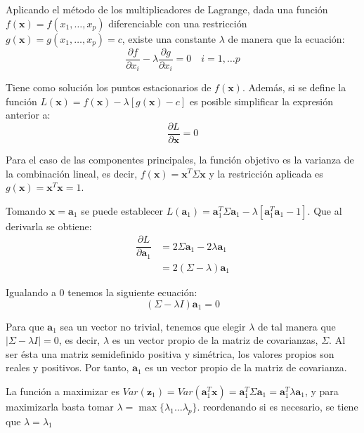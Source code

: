 \noindent Aplicando el método de los multiplicadores de Lagrange,  dada una función $f(\textbf{x})=f(x_1,\ldots, x_p)$ diferenciable con una restricción $g(\textbf{x})=g(x_1, \ldots, x_p)=c$,  existe una constante $\lambda$ de manera que la ecuación:
\begin{equation}
\dfrac{\partial f}{\partial x_i}-\lambda\dfrac{\partial g}{\partial x_i}=0 \quad i=1,\ldots p 
\end{equation}

\noindent Tiene como solución los puntos estacionarios de $f(\textbf{x})$. Además, si se define la función $L(\textbf{x})= f(\textbf{x})-\lambda[g(\textbf{x})-c]$  es posible simplificar la expresión anterior a:
\begin{equation}
\dfrac{\partial L}{\partial \textbf{x}}=0
\end{equation}

\noindent Para el caso de las componentes principales, la función objetivo es la varianza de la combinación lineal, es decir, $f(\textbf{x})=\textbf{x}^T \Sigma \textbf{x}$ y la restricción aplicada es $g(\textbf{x})=\textbf{x}^T\textbf{x}=1$. 

\noindent Tomando $\textbf{x}=\textbf{a}_1$ se puede establecer $L(\textbf{a}_1)=\textbf{a}_1^T \Sigma \textbf{a}_1 - \lambda[\textbf{a}_1^T \textbf{a}_1-1]$. Que al derivarla se obtiene:
\begin{align*}
\dfrac{\partial L}{\partial \textbf{a}_1} &= 2\Sigma \textbf{a}_1 - 2\lambda\textbf{a}_1\\
& = 2(\Sigma-\lambda)\textbf{a}_1 
\end{align*}

\noindent Igualando a 0 tenemos la siguiente ecuación: 
\begin{equation}
(\Sigma-\lambda I)\textbf{a}_1=0
\end{equation}

\noindent Para que $\textbf{a}_1$ sea un vector no trivial, tenemos que elegir $\lambda$ de tal manera que $|\Sigma-\lambda I| = 0$, es decir, $\lambda$ es un vector propio de la matriz de covarianzas, $\Sigma$. Al ser ésta una matriz semidefinido positiva y simétrica, los valores propios son reales y positivos. Por tanto, $\textbf{a}_1$ es un vector propio de la matriz de covarianza.

\noindent La función a maximizar es $Var(\textbf{z}_1)=Var(\textbf{a}_1^T\textbf{x})=\textbf{a}_1^T\Sigma \textbf{a}_1=\textbf{a}_1^T\lambda \textbf{a}_1$, y para maximizarla basta tomar $\lambda=\max{\lbrace\lambda_1\ldots \lambda_p\rbrace}$. reordenando si es necesario, se tiene que $\lambda=\lambda_1$ 

